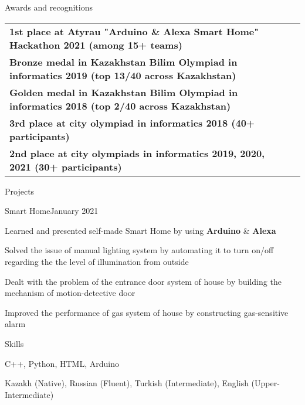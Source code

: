 \documentclass{resume}
\begin{document}

\begin{rSection}{Awards and recognitions}

\begin{tabular}{ @{} >{\bfseries}l @{\hspace{6ex}} l }
1st place at Atyrau "Arduino \& Alexa Smart Home" Hackathon 2021 (among 15+ teams) \\
Bronze medal in Kazakhstan Bilim Olympiad in informatics 2019 (top 13/40 across Kazakhstan)\\
Golden medal in Kazakhstan Bilim Olympiad in informatics 2018 (top 2/40 across Kazakhstan) \\
3rd place at city olympiad in informatics 2018 (40+ participants) \\
2nd place at city olympiads in informatics 2019, 2020, 2021 (30+ participants) \\
\end{tabular}

\end{rSection}



\begin{rSection}{Projects}

\begin{rSubsection}{Smart Home}{}{January 2021}{}
\item Learned and presented self-made Smart Home by using \textbf{Arduino} \& \textbf{Alexa}
\item Solved the issue of manual lighting system by automating it to turn on/off regarding the the level of illumination from outside
\item Dealt with the problem of the entrance door system of house by building the mechanism of motion-detective door
\item Improved the performance of gas system of house by constructing gas-sensitive alarm
\end{rSubsection}

\end{rSection}

\begin{rSection}{Skills}

\begin{rSubsection}{}{}{}{}
\item C++, Python, HTML, Arduino
\item Kazakh (Native), Russian (Fluent), Turkish (Intermediate), English (Upper-Intermediate)
\end{rSubsection}


\end{rSection}
\end{document}

